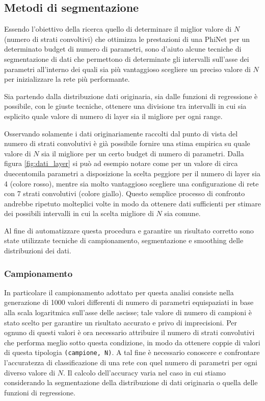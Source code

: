 \subsection{Metodi di segmentazione}

Essendo l'obiettivo della ricerca quello di determinare il miglior valore di $N$ (numero di strati convoltivi) che ottimizza le prestazioni di una PhiNet per un determinato budget di numero di parametri, sono d'aiuto alcune tecniche di segmentazione di dati che permettono di determinate gli intervalli sull'asse dei parametri all'interno dei quali sia più vantaggioso scegliere un preciso valore di $N$ per inizializzare la rete più performante.

Sia partendo dalla distribuzione dati originaria, sia dalle funzioni di regressione è possibile, con le giuste tecniche, ottenere una divisione tra intervalli in cui sia esplicito quale valore di numero di layer sia il migliore per ogni range.

Osservando solamente i dati originariamente raccolti dal punto di vista del numero di strati convolutivi  è già possibile fornire una stima empirica su quale valore di $N$ sia il migliore per un certo budget di numero di parametri. Dalla figura \ref{fig:dati_layer} si può ad esempio notare come per un valore di circa duecentomila parametri a disposizione la scelta peggiore per il numero di layer sia 4 (colore rosso), mentre sia molto vantaggioso scegliere una configurazione di rete con 7 strati convolutivi (colore giallo). Questo semplice processo di confronto andrebbe ripetuto molteplici volte in modo da ottenere dati sufficienti per stimare dei possibili intervalli in cui la scelta migliore di $N$ sia comune.

Al fine di automatizzare questa procedura e garantire un risultato corretto sono state utilizzate tecniche di campionamento, segmentazione e smoothing delle distribuzioni dei dati. 

\subsubsection{Campionamento}
In particolare il campionamento adottato per questa analisi consiste nella generazione di 1000 valori differenti di numero di parametri equispaziati in base alla scala logaritmica sull'asse delle ascisse; tale valore di numero di campioni è stato scelto per garantire un risultato accurato e privo di imprecisioni.
Per ognuno di questi valori è ora necessario attribuire il numero di strati convolutivi che performa meglio sotto questa condizione, in modo da ottenere coppie di valori di questa tipologia \texttt{(campione, N)}. A tal fine è necessario conoscere e confrontare l'accuratezza di classificazione di una rete con quel numero di parametri per ogni diverso valore di $N$. Il calcolo dell'accuracy varia nel caso in cui stiamo considerando la segmentazione della distribuzione di dati originaria o quella delle funzioni di regressione. 


